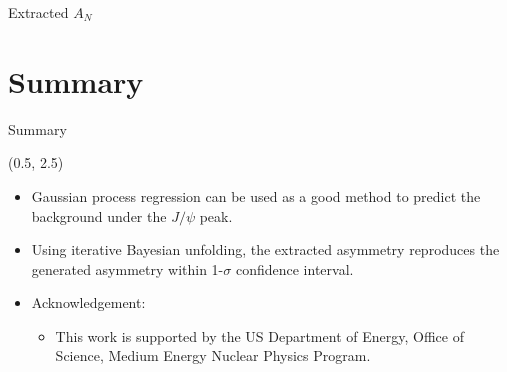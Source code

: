 \documentclass[11pt, xcolor={dvipsnames}, aspectratio = 169]{beamer}
\begin{document}
\begin{frame}{Extracted $A_{N}$}
\end{frame}

%
%
\section{Summary}

\begin{frame}{Summary}

\begin{textblock}{15.0}(0.5, 2.5)

\begin{itemize}

\item Gaussian process regression can be used as a good method to predict the background under the $J/\psi$ peak.

\item Using iterative Bayesian unfolding, the extracted asymmetry reproduces the generated asymmetry within 1-$\sigma$ confidence interval.

\item Acknowledgement:

\begin{itemize}
    \item This work is supported by the US Department of Energy, Office of Science, Medium Energy Nuclear Physics Program.
\end{itemize}

\end{itemize}

\end{textblock}

\end{frame}
\end{document}
